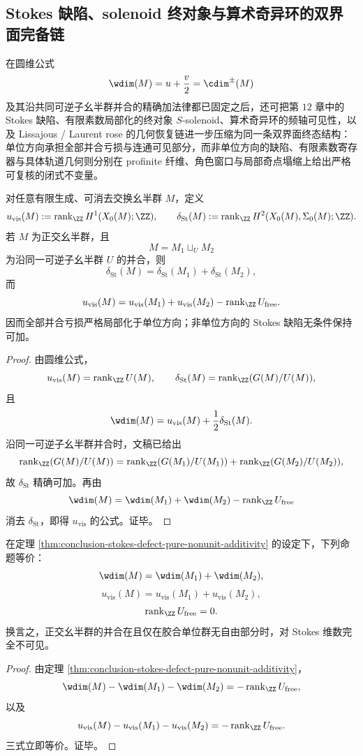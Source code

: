 \subsection{Stokes 缺陷、solenoid 终对象与算术奇异环的双界面完备链}\label{subsec:conclusion-stokes-solenoid-singularring-lissajous-rose-completeness}
在圆维公式
\[
\wdim(M)=u+\frac{v}{2}=\cdim^{\pm}(M)
\]
及其沿共同可逆子幺半群并合的精确加法律都已固定之后，还可把第 \(12\) 章中的 Stokes 缺陷、有限素数局部化的终对象 \(S\)-solenoid、算术奇异环的频轴可见性，以及 Lissajous / Laurent rose 的几何恢复链进一步压缩为同一条双界面终态结构：单位方向承担全部并合亏损与连通可见部分，而非单位方向的缺陷、有限素数寄存器与具体轨道几何则分别在 profinite 纤维、角色窗口与局部奇点塌缩上给出严格可复核的闭式不变量。

\begin{theorem}\label{thm:conclusion-stokes-defect-pure-nonunit-additivity}
对任意有限生成、可消去交换幺半群 \(M\)，定义
\[
u_{\mathrm{vis}}(M):=\operatorname{rank}_{\ZZ}H^1(X_0(M);\ZZ),
\qquad
\delta_{\mathrm{St}}(M):=\operatorname{rank}_{\ZZ}H^2(X_0(M),\Sigma_0(M);\ZZ).
\]
若 \(M\) 为正交幺半群，且
\[
M=M_1\sqcup_U M_2
\]
为沿同一可逆子幺半群 \(U\) 的并合，则
\[
\delta_{\mathrm{St}}(M)=\delta_{\mathrm{St}}(M_1)+\delta_{\mathrm{St}}(M_2),
\]
而
\[
u_{\mathrm{vis}}(M)
=
u_{\mathrm{vis}}(M_1)+u_{\mathrm{vis}}(M_2)-\operatorname{rank}_{\ZZ}U_{\mathrm{free}}.
\]
因而全部并合亏损严格局部化于单位方向；非单位方向的 Stokes 缺陷无条件保持可加。
\end{theorem}
\begin{proof}
由圆维公式，
\[
u_{\mathrm{vis}}(M)=\operatorname{rank}_{\ZZ}U(M),
\qquad
\delta_{\mathrm{St}}(M)=\operatorname{rank}_{\ZZ}(G(M)/U(M)),
\]
且
\[
\wdim(M)=u_{\mathrm{vis}}(M)+\frac{1}{2}\delta_{\mathrm{St}}(M).
\]
沿同一可逆子幺半群并合时，文稿已给出
\[
\operatorname{rank}_{\ZZ}(G(M)/U(M))
=
\operatorname{rank}_{\ZZ}(G(M_1)/U(M_1))
+
\operatorname{rank}_{\ZZ}(G(M_2)/U(M_2)),
\]
故 \(\delta_{\mathrm{St}}\) 精确可加。再由
\[
\wdim(M)=\wdim(M_1)+\wdim(M_2)-\operatorname{rank}_{\ZZ}U_{\mathrm{free}}
\]
消去 \(\delta_{\mathrm{St}}\)，即得 \(u_{\mathrm{vis}}\) 的公式。证毕。
\end{proof}

\begin{corollary}\label{cor:conclusion-finite-unit-gluing-stokes-invisibility}
在定理 \ref{thm:conclusion-stokes-defect-pure-nonunit-additivity} 的设定下，下列命题等价：
\[
\wdim(M)=\wdim(M_1)+\wdim(M_2),
\]
\[
u_{\mathrm{vis}}(M)=u_{\mathrm{vis}}(M_1)+u_{\mathrm{vis}}(M_2),
\]
\[
\operatorname{rank}_{\ZZ}U_{\mathrm{free}}=0.
\]
换言之，正交幺半群的并合在且仅在胶合单位群无自由部分时，对 Stokes 维数完全不可见。
\end{corollary}
\begin{proof}
由定理 \ref{thm:conclusion-stokes-defect-pure-nonunit-additivity}，
\[
\wdim(M)-\wdim(M_1)-\wdim(M_2)
=
-\operatorname{rank}_{\ZZ}U_{\mathrm{free}},
\]
以及
\[
u_{\mathrm{vis}}(M)-u_{\mathrm{vis}}(M_1)-u_{\mathrm{vis}}(M_2)
=
-\operatorname{rank}_{\ZZ}U_{\mathrm{free}}.
\]
三式立即等价。证毕。
\end{proof}

